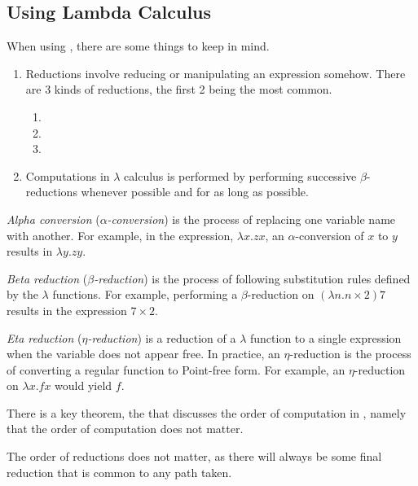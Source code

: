 \subsection{Using Lambda Calculus}\label{subsec:Using_Lambda_Calculus}
When using , there are some things to keep in mind.
\begin{enumerate}[noitemsep]
\item Reductions involve reducing or manipulating an expression somehow.
  There are 3 kinds of reductions, the first 2 being the most common.
  \begin{enumerate}[noitemsep]
  \item {}
  \item {}
  \item {}
  \end{enumerate}
\item Computations in $\lambda$ calculus is performed by performing successive $\beta$-reductions whenever possible and for as long as possible.
\end{enumerate}

\begin{definition}\label{def:Alpha_Conversion}
  \emph{Alpha conversion} (\emph{$\alpha$-conversion}) is the process of replacing one variable name with another.
  For example, in the expression, $\lambda x. zx$, an $\alpha$-conversion of $x$ to $y$ results in $\lambda y. zy$.
\end{definition}

\begin{definition}\label{def:Beta_Reduction}
  \emph{Beta reduction} (\emph{$\beta$-reduction}) is the process of following substitution rules defined by the $\lambda$ functions.
  For example, performing a $\beta$-reduction on $(\lambda n. n \times 2) 7$ results in the expression $7 \times 2$.
\end{definition}

\begin{definition}\label{def:Eta_Reduction}
  \emph{Eta reduction} (\emph{$\eta$-reduction}) is a reduction of a $\lambda$ function to a single expression when the variable does not appear free.
  In practice, an $\eta$-reduction is the process of converting a regular function to Point-free form.
  For example, an $\eta$-reduction on $\lambda x. f x$ would yield $f$.
\end{definition}

There is a key theorem, the  that discusses the order of computation in , namely that the order of computation does not matter.

\begin{theorem}\label{thm:Church_Rosser_Theorem}
  The order of reductions does not matter, as there will always be some final reduction that is common to any path taken.
\end{theorem}


